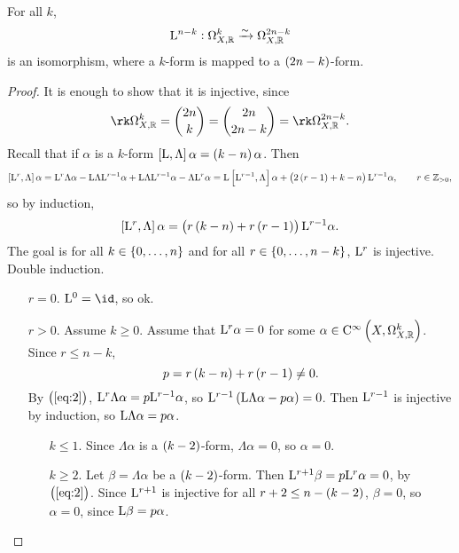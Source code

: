 \pagebreak

\begin{proposition}
\label{prop:6.42}
For all $ k $,
$$ \mathrm{L}^{n - k} : \Omega_{X, \mathbb{R}}^k \xrightarrow{\sim} \Omega_{X, \mathbb{R}}^{2n - k} $$
is an isomorphism, where a $ k $-form is mapped to a $ \br{2n - k} $-form.
\end{proposition}


\begin{proof}
It is enough to show that it is injective, since
$$ \rk \Omega_{X, \RR}^k = \binom{2n}{k} = \binom{2n}{2n - k} = \rk \Omega_{X, \RR}^{2n - k}. $$
Recall that if $ \alpha $ is a $ k $-form $ \sbr{\L, \Lambda}\alpha = \br{k - n}\alpha $. Then
$$ \sbr{\L^r, \Lambda}\alpha = \L^r\Lambda\alpha - \L\Lambda\L^{r - 1}\alpha + \L\Lambda\L^{r - 1}\alpha - \Lambda\L^r\alpha = \L\sbr{\L^{r - 1}, \Lambda}\alpha + \br{2\br{r - 1} + k - n}\L^{r - 1}\alpha, \qquad r \in \ZZ_{> 0}, $$
so by induction,
\begin{equation}
\label{eq:2}
\sbr{\L^r, \Lambda}\alpha = \br{r\br{k - n} + r\br{r - 1}}\L^{r - 1}\alpha.
\end{equation}
The goal is for all $ k \in \cbr{0, \dots, n} $ and for all $ r \in \cbr{0, \dots, n - k} $, $ \mathrm{L}^r $ is injective. Double induction.
\begin{itemize}[leftmargin=0.5in]
\item[$ r = 0 $.] $ \L^0 = \id $, so ok.
\item[$ r > 0 $.] Assume $ k \ge 0 $. Assume that $ \mathrm{L}^r\alpha = 0 $ for some $ \alpha \in \C^\infty\br{X, \Omega_{X, \RR}^k} $. Since $ r \le n - k $,
$$ p = r\br{k - n} + r\br{r - 1} \ne 0. $$
By $ \br{\ref{eq:2}} $, $ \mathrm{L}^r\Lambda\alpha = p\mathrm{L}^{r - 1}\alpha $, so $ \L^{r - 1}\br{\L\Lambda\alpha - p\alpha} = 0 $. Then $ \mathrm{L}^{r - 1} $ is injective by induction, so $ \mathrm{L}\Lambda\alpha = p\alpha $.
\begin{itemize}[leftmargin=0.5in]
\item[$ k \le 1 $.] Since $ \Lambda\alpha $ is a $ \br{k - 2} $-form, $ \Lambda\alpha = 0 $, so $ \alpha = 0 $.
\item[$ k \ge 2 $.] Let $ \beta = \Lambda\alpha $ be a $ \br{k - 2} $-form. Then $ \mathrm{L}^{r + 1}\beta = p\mathrm{L}^r\alpha = 0 $, by $ \br{\ref{eq:2}} $. Since $ \mathrm{L}^{r + 1} $ is injective for all $ r + 2 \le n - \br{k - 2} $, $ \beta = 0 $, so $ \alpha = 0 $, since $ \mathrm{L}\beta = p\alpha $.
\end{itemize}
\end{itemize}
\end{proof}

